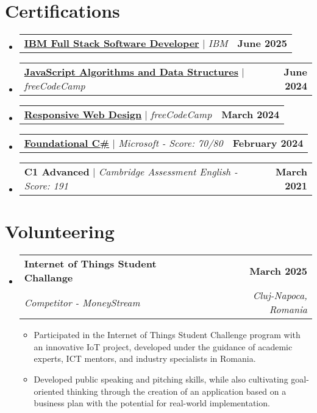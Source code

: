 \documentclass[letterpaper,11pt]{article}
\makeatletter
\newcommand{\resumeItem}[1]{
  \item\small{
    {#1 \vspace{-2pt}}
  }
}
\newcommand{\resumeSubheading}[4]{
  \vspace{-2pt}\item
    \begin{tabular*}{1.0\textwidth}[t]{l@{\extracolsep{\fill}}r}
      \textbf{#1} & \textbf{\small #2} \\
      \textit{\small#3} & \textit{\small #4} \\
    \end{tabular*}\vspace{-7pt}
}
\newcommand{\resumeProjectHeading}[2]{
    \item
    \begin{tabular*}{1.001\textwidth}{l@{\extracolsep{\fill}}r}
      \small#1 & \textbf{\small #2}\\
    \end{tabular*}\vspace{-7pt}
}
\newcommand{\resumeSubHeadingListStart}{\begin{itemize}[leftmargin=0.0in, label={}]}
\newcommand{\resumeSubHeadingListEnd}{\end{itemize}}
\newcommand{\resumeItemListStart}{\begin{itemize}}
\newcommand{\resumeItemListEnd}{\end{itemize}\vspace{-5pt}}
\makeatother
\begin{document}
\section{Certifications}
    \resumeSubHeadingListStart
      \resumeProjectHeading
          {\textbf{\href{https://coursera.org/verify/professional-cert/BIP07DN5KMY3}{IBM Full Stack Software Developer}} $|$ \emph{IBM}}{June 2025}
          \vspace{-20pt}
      \resumeProjectHeading
          {\textbf{\href{https://www.freecodecamp.org/certification/BogdanBargaoanu/javascript-algorithms-and-data-structures-v8}{JavaScript Algorithms and Data Structures}} $|$ \emph{freeCodeCamp}}{June 2024}
          \vspace{-20pt}
      \resumeProjectHeading
          {\textbf{\href{https://www.freecodecamp.org/certification/BogdanBargaoanu/responsive-web-design}{Responsive Web Design}} $|$ \emph{freeCodeCamp}}{March 2024}
          \vspace{-20pt}
      \resumeProjectHeading
          {\textbf{\href{https://www.freecodecamp.org/certification/BogdanBargaoanu/foundational-c-sharp-with-microsoft}{Foundational \mbox{C{\#}}}} $|$ \emph{Microsoft - Score: 70/80}}{February 2024}
          \vspace{-20pt}
      \resumeProjectHeading
          {\textbf{C1 Advanced} $|$ \emph{Cambridge Assessment English - Score: 191}}{March 2021}
    \resumeSubHeadingListEnd
\section{Volunteering}
    \resumeSubHeadingListStart
        \resumeSubheading{Internet of Things Student Challange }{March 2025}{Competitor - MoneyStream }{Cluj-Napoca, Romania}
        \vspace{2pt}
            \resumeItemListStart
                \resumeItem{Participated in the Internet of Things Student Challenge program with an innovative IoT project, developed under the guidance of academic experts, ICT mentors, and industry specialists in Romania.}
                \resumeItem{Developed public speaking and pitching skills, while also cultivating goal-oriented thinking through the creation of an application based on a business plan with the potential for real-world implementation.}
            \resumeItemListEnd
    \resumeSubHeadingListEnd
%
\end{document}
